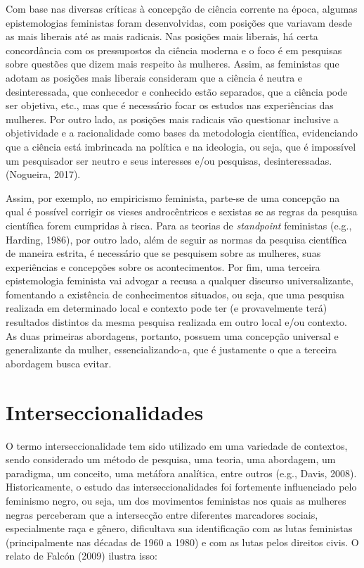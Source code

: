 Com base nas diversas críticas à concepção de ciência corrente na época, algumas epistemologias feministas foram desenvolvidas, com posições que variavam desde as mais liberais até as mais radicais. Nas posições mais liberais, há certa concordância com os pressupostos da ciência moderna e o foco é em pesquisas sobre questões que dizem mais respeito às mulheres. Assim, as feministas que adotam as posições mais liberais consideram que a ciência é neutra e desinteressada, que conhecedor e conhecido estão separados, que a ciência pode ser objetiva, etc., mas que é necessário focar os estudos nas experiências das mulheres. Por outro lado, as posições mais radicais vão questionar inclusive a objetividade e a racionalidade como bases da metodologia científica, evidenciando que a ciência está imbrincada na política e na ideologia, ou seja, que é impossível um pesquisador ser neutro e seus interesses e/ou pesquisas, desinteressadas. (Nogueira, 2017).

Assim, por exemplo, no empiricismo feminista, parte-se de uma concepção na qual é possível corrigir os vieses androcêntricos e sexistas se as regras da pesquisa científica forem cumpridas à risca. Para as teorias de \textit{standpoint} feministas (e.g., Harding, 1986), por outro lado, além de seguir as normas da pesquisa científica de maneira estrita, é necessário que se pesquisem sobre as mulheres, suas experiências e concepções sobre os acontecimentos. Por fim, uma terceira epistemologia feminista vai advogar a recusa a qualquer discurso universalizante, fomentando a existência de conhecimentos situados, ou seja, que uma pesquisa realizada em determinado local e contexto pode ter (e provavelmente terá) resultados distintos da mesma pesquisa realizada em outro local e/ou contexto. As duas primeiras abordagens, portanto, possuem uma concepção universal e generalizante da mulher, essencializando-a, que é justamente o que a terceira abordagem busca evitar.

\section*{Interseccionalidades}

O termo interseccionalidade tem sido utilizado em uma variedade de contextos, sendo considerado um método de pesquisa, uma teoria, uma abordagem, um paradigma, um conceito, uma metáfora analítica, entre outros (e.g., Davis, 2008). Historicamente, o estudo das interseccionalidades foi fortemente influenciado pelo feminismo negro, ou seja, um dos movimentos feministas nos quais as mulheres negras perceberam que a intersecção entre diferentes marcadores sociais, especialmente raça e gênero, dificultava sua identificação com as lutas feministas (principalmente nas décadas de 1960 a 1980) e com as lutas pelos direitos civis. O relato de Falcón (2009) ilustra isso:

